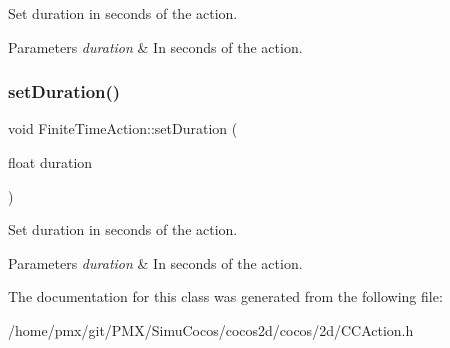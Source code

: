 Set duration in seconds of the action.


\begin{DoxyParams}{Parameters}
{\em duration} & In seconds of the action. \\
\hline
\end{DoxyParams}
\mbox{\label{classFiniteTimeAction_a58c2f166e94dd5b39f8a4b566adf1281}} 
\subsubsection{\texorpdfstring{set\+Duration()}{setDuration()}\hspace{0.1cm}{\footnotesize\ttfamily [2/2]}}
{\footnotesize\ttfamily void Finite\+Time\+Action\+::set\+Duration (\begin{DoxyParamCaption}\item[{float}]{duration }\end{DoxyParamCaption})\hspace{0.3cm}{\ttfamily [inline]}}

Set duration in seconds of the action.


\begin{DoxyParams}{Parameters}
{\em duration} & In seconds of the action. \\
\hline
\end{DoxyParams}


The documentation for this class was generated from the following file\+:\begin{DoxyCompactItemize}
\item 
/home/pmx/git/\+P\+M\+X/\+Simu\+Cocos/cocos2d/cocos/2d/C\+C\+Action.\+h\end{DoxyCompactItemize}
